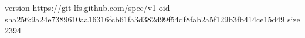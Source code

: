 version https://git-lfs.github.com/spec/v1
oid sha256:9a24e7389610aa16316fcb61fa3d382d99f54df8fab2a5f129b3fb414ce15d49
size 2394
